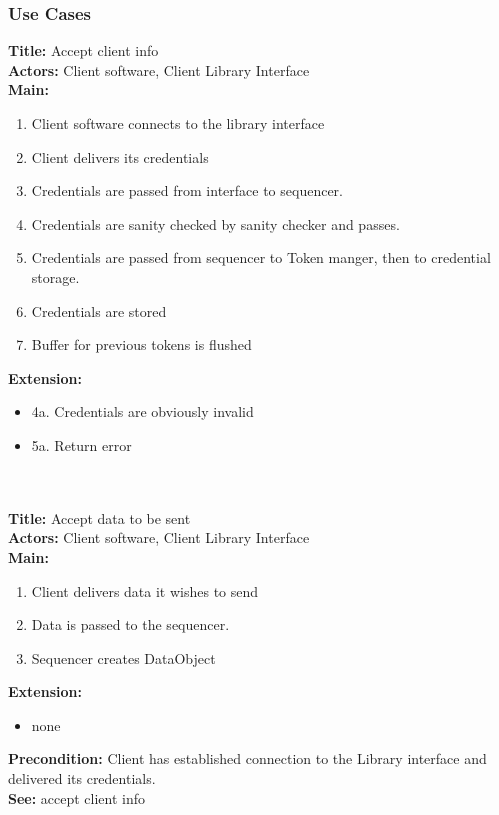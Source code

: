 	\subsubsection{Use Cases}\label{Client Use Cases}
		\textbf{Title:} Accept client info \\
		\textbf{Actors:} Client software, Client Library Interface \\
		\textbf{Main:}
		\begin{enumerate}
			\item Client software connects to the library interface
			\item Client delivers its credentials
			\item Credentials are passed from interface to sequencer.
			\item Credentials are sanity checked by sanity checker and passes.
			\item Credentials are passed from sequencer to Token manger, then to credential storage.
			\item Credentials are stored
			\item Buffer for previous tokens is flushed
		\end{enumerate}
		\textbf{Extension:} 
		\begin{itemize}
			  \item[] 4a. Credentials are obviously invalid
			  \item[] 5a. Return error
		\end{itemize}
		\\\\
		\textbf{Title:} Accept data to be sent \\
		\textbf{Actors:} Client software, Client Library Interface \\
		\textbf{Main:}
		\begin{enumerate}
			\item Client delivers data it wishes to send
			\item Data is passed to the sequencer.
			\item Sequencer creates DataObject
		\end{enumerate}
		\textbf{Extension:}
		\begin{itemize}
			 \item[] none
		\end{itemize}
		\textbf{Precondition:} Client has established connection to the Library interface and delivered its credentials. \\
		\textbf{See:} accept client info
		\\\\
